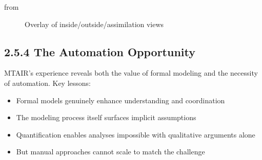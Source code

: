 \documentclass[
  11pt,
  letterpaper,
]{book}
\providecommand{\tightlist}{%
  \setlength{\itemsep}{0pt}\setlength{\parskip}{0pt}}
\begin{document}
from \textcite{manheim2021}

\begin{figure}


\caption[Overlay of inside/outside/assimilation
views]{\label{fig-mtair-insideoutside-overlay}Overlay of
inside/outside/assimilation views}

\end{figure}%

\subsection*{2.5.4 The Automation
Opportunity}\label{sec-automation-opportunity}

MTAIR's experience reveals both the value of formal modeling and the
necessity of automation. Key lessons:

\begin{itemize}
\tightlist
\item
  Formal models genuinely enhance understanding and coordination
\item
  The modeling process itself surfaces implicit assumptions
\item
  Quantification enables analyses impossible with qualitative arguments
  alone
\item
  But manual approaches cannot scale to match the challenge
\end{itemize}
\end{document}
